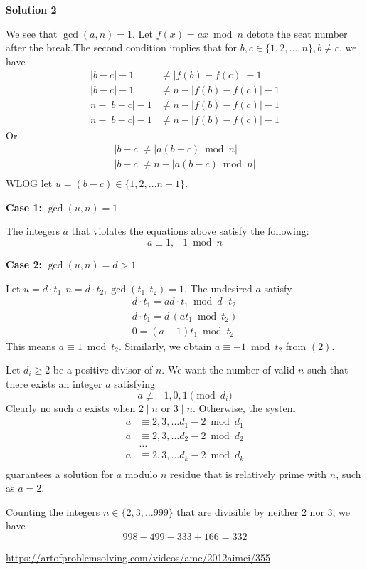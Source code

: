 \begin{enumerate}
 



\textbf{Solution 2}

We see that $\gcd(a, n)=1$. Let $f(x)=ax\bmod{n}$ detote the seat number after the break.The second condition implies that for $b,c\in\{1,2,\ldots, n\}, b\neq c$, we have\begin{align*}\lvert b-c\rvert -1 &\neq \lvert f(b)-f(c)\rvert -1\\\lvert b-c\rvert -1 &\neq n- \lvert f(b)-f(c)\rvert -1\\n-\lvert b-c\rvert -1 &\neq n- \lvert f(b)-f(c)\rvert -1\\n-\lvert b-c\rvert -1 &\neq n- \lvert f(b)-f(c)\rvert -1\end{align*}
Or\begin{gather}\lvert b-c\rvert \neq \lvert a(b-c)\bmod{n}\rvert\\\lvert b-c\rvert \neq n - \lvert a(b-c)\bmod{n}\rvert\\\end{gather}WLOG let $u = (b-c)\in\{1,2,\ldots n-1\}$.

 \textbf{Case 1: }$\gcd{(u,n)}=1$

 The integers $a$ that violates the equations above satisfy the following:
 \[a\equiv 1, -1\bmod{n}\]

 \textbf{Case 2: }$\gcd{(u,n)}=d>1$

 Let $u=d\cdot t_1, n=d\cdot t_2, \gcd(t_1,t_2)=1$. The undesired $a$ satisfy\begin{align*}d\cdot t_1=ad\cdot t_1\bmod{d\cdot t_2}\\d\cdot t_1=d\, (at_1\bmod{t_2})\\0=(a-1)t_1\bmod{t_2}\end{align*}
This means $a\equiv 1\bmod{t_2}$. Similarly, we obtain $a\equiv -1\bmod{t_2}$ from $(2)$.

 Let $d_i\ge 2$ be a positive divisor of $n$. We want the number of valid $n$ such that there exists an integer $a$ satisfying
 \[a\not\equiv -1, 0, 1 \pmod{d_i}\]Clearly no such $a$ exists when $2\mid n$ or $3\mid n$. Otherwise, the system\begin{align*}a&\equiv 2,3,\ldots d_1 -2\bmod{d_1}\\a&\equiv 2,3,\ldots d_2 -2\bmod{d_2}\\&\ldots\\a&\equiv 2,3,\ldots d_k -2\bmod{d_k}\\\end{align*}
guarantees a solution for $a$ modulo $n$ residue that is relatively prime with $n$, such as $a=2$. 

 Counting the integers $n\in\{2,3,\ldots 999\}$ that are divisible by neither $2$ nor $3$, we have
 \[998-499-333+166=\boxed{332}\]

 \href{https://artofproblemsolving.com/videos/amc/2012aimei/355}{https://artofproblemsolving.com/videos/amc/2012aimei/355}

 


\end{enumerate}
